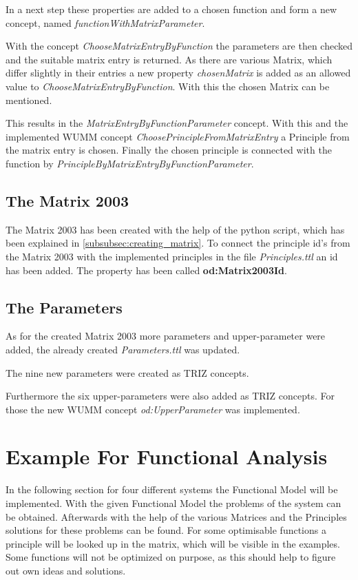 \documentclass[11pt,a4paper]{article}
\begin{document}
In a next step these properties are added to a chosen function and form a new
concept, named \textit{functionWithMatrixParameter}.

With the concept \textit{ChooseMatrixEntryByFunction} the parameters are then
checked and the suitable matrix entry is returned.  As there are various
Matrix, which differ slightly in their entries a new property
\textit{chosenMatrix} is added as an allowed value to
\textit{ChooseMatrixEntryByFunction}.  With this the chosen Matrix can be
mentioned.

This results in the \textit{MatrixEntryByFunctionParameter} concept.  With
this and the implemented WUMM concept \textit{ChoosePrincipleFromMatrixEntry}
a Principle from the matrix entry is chosen.  Finally the chosen principle is
connected with the function by
\textit{PrincipleByMatrixEntryByFunctionParameter}.

\subsection{The Matrix 2003}

The Matrix 2003 has been created with the help of the python script, which has
been explained in \ref{subsubsec:creating_matrix}.  To connect the principle
id's from the Matrix 2003 with the implemented principles in the file
\textit{Principles.ttl} an id has been added.  The property has been called
\textbf{od:Matrix2003Id}.

\subsection{The Parameters}

As for the created Matrix 2003 more parameters and upper-parameter were added,
the already created \textit{Parameters.ttl} was updated.

The nine new parameters were created as TRIZ concepts.

Furthermore the six upper-parameters were also added as TRIZ concepts.  For
those the new WUMM concept \textit{od:UpperParameter} was implemented.

\section{Example For Functional Analysis}
\label{sec:examples}

In the following section for four different systems the Functional Model will
be implemented.  With the given Functional Model the problems of the system
can be obtained.  Afterwards with the help of the various Matrices and the
Principles solutions for these problems can be found.  For some optimisable
functions a principle will be looked up in the matrix, which will be visible
in the examples.  Some functions will not be optimized on purpose, as this
should help to figure out own ideas and solutions.
\end{document}
